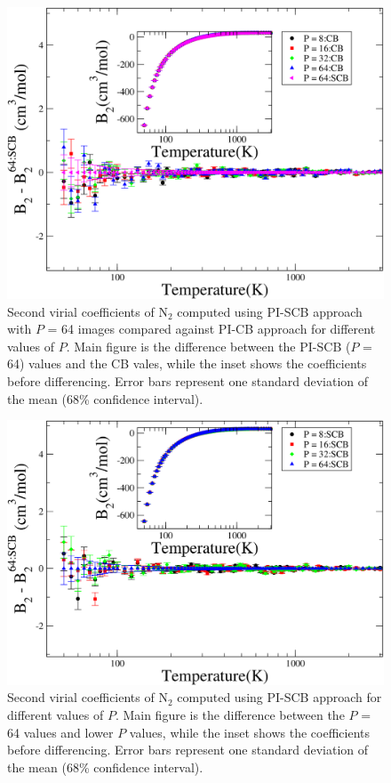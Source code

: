         \begin{figure}[!htbp]
            \centering
            \includegraphics[scale=0.20,keepaspectratio]{Chapter-5/Figures/B2N2AllPIDiff.png}
            \caption{Second virial coefficients of N$_2$ computed using PI-SCB approach with $P$ = 64 images compared against PI-CB approach for different values of $P$. Main figure is the difference between the PI-SCB ($P$ = 64) values and the CB vales, while the inset shows the coefficients before differencing. Error bars represent one standard deviation of the mean (68\% confidence interval).}
            \label{fig:B2N2AllPIDiff}
        \end{figure}

        \begin{figure}[!htbp]
            \centering
            \includegraphics[scale=0.20,keepaspectratio]{Chapter-5/Figures/B2N2AllSCBDiff.png}
            \caption{Second virial coefficients of N$_2$ computed using PI-SCB approach for different values of $P$. Main figure is the difference between the $P$ = 64 values and lower $P$ values, while the inset shows the coefficients before differencing. Error bars represent one standard deviation of the mean (68\% confidence interval).}
            \label{fig:B2N2AllSCBDiff}
        \end{figure}


